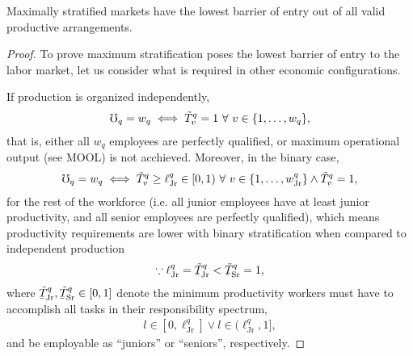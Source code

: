 \documentclass[hidelinks, nonatbib]{elsarticle}
\begin{document}
\begin{lemma}
    \label{mpl}
    Maximally stratified markets have the lowest barrier of entry out of all valid productive arrangements.
    
    \begin{proof}
        To prove maximum stratification poses the lowest barrier of entry to the labor market, let us consider what is required in other economic configurations.
        
        If production is organized independently,
        \begin{gather}
        \mho_q = w_q
        \iff
        \tilde{T}_{v}^{q}
        =
        1
        \
        \forall
        \
        v \in \{1, \dots, w_q\}
        ,
        \end{gather}
        that is, either all $w_q$ employees are perfectly qualified, or maximum operational output (see MOOL) is not acchieved. Moreover, in the binary case,
        \begin{gather}
        \mho_q = w_q
        \iff
        \tilde{T}_{v}^{q}
        \geq
        \ell_{\text{Jr}}^{q}
        \in
        [0,1)
        \
        \forall
        \
        v \in \{1, \dots, w_{\text{Jr}}^{q}\}
        \land
        \tilde{T}_{v}^{q}
        =
        1
        ,
        \end{gather}
        for the rest of the workforce (i.e. all junior employees have at least junior productivity, and all senior employees are perfectly qualified), which means productivity requirements are lower with binary stratification when compared to independent production
        \begin{gather}
            \because
            \ell_{\text{Jr}}^{q}
            =
            \underaccent{\bar}{\tilde{T}}_{\text{Jr}}^{q}
            <
            \underaccent{\bar}{\tilde{T}}_{\text{Sr}}^{q}
            = 1
            ,
        \end{gather}
        where $\underaccent{\bar}{\tilde{T}}_{\text{Jr}}^{q}, \underaccent{\bar}{\tilde{T}}_{\text{Sr}}^{q} \in [0,1]$ denote the minimum productivity workers must have to accomplish all tasks in their responsibility spectrum,
        \begin{gather}
            l \in [0, \ell_{\text{Jr}}^{q}]
            \lor
            l \in (\ell_{\text{Jr}}^{q}, 1]
            ,
        \end{gather}
        and be employable as ``juniors'' or ``seniors'', respectively.


\end{proof}
\end{lemma}
\end{document}
